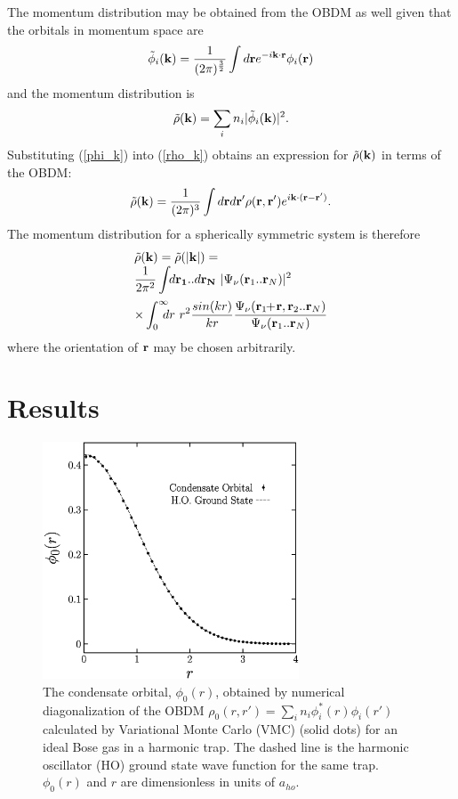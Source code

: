 \documentclass[aps,pra,twocolumn,groupedaddress]{revtex4}
\def\strut{\rule[-0.5cm]{0cm}{1cm}}
\begin{document}
The momentum distribution may be obtained from the OBDM as well given that
the orbitals in momentum space are 
\begin{equation}
\tilde{\phi}_i({\bf k}) = \frac{1}{ (2\pi)^{\frac{3}{2}} }
			\int d{\bf r} e^{ -i{\bf k}\cdot{\bf r} } 
			{\phi}_i({\bf r})
\label{phi_k}
\end{equation}
and the momentum distribution is
\begin{equation}
\tilde{\rho}({\bf k}) = \sum_i n_i|\tilde{\phi}_i({\bf k})|^2.
\label{rho_k}
\end{equation}
Substituting (\ref{phi_k}) into (\ref{rho_k}) obtains an expression for
$\tilde{\rho}({\bf k})$ in terms of the OBDM:
\begin{equation}
\tilde{\rho}({\bf k}) = \frac{1}{(2\pi)^3}\int d{\bf r}d{\bf r}'
		\rho({\bf r},{\bf r}')e^{i{\bf k}\cdot 
		({\bf r}-{\bf r'})}.
\end{equation}
The momentum distribution for a spherically symmetric system is therefore 
\begin{equation}
\begin{array}{l}
{\displaystyle
\tilde{\rho}({\bf k}) = \tilde{\rho}(|{\bf k}|) = 
}\\ 
\strut
\strut
{\displaystyle
\frac{1}{2\pi^2}\int \!\!d{\bf r_1}..d{\bf r_N}\  
	|\Psi_{\nu}({\bf r}_1..{\bf r}_N)|^2
}\\
{\displaystyle
\times	\int_0^{\infty}\!\!\!\!dr \  r^2 \frac{sin(kr)}{kr}
	\frac{\Psi_{\nu}({\bf r}_1\!\!+\!{\bf r},{\bf r}_2..{\bf r}_N)}
	{\Psi_{\nu}({\bf r}_1..{\bf r}_N)}
}
\end{array}
\end{equation}
where the orientation of ${\bf r}$ may be chosen arbitrarily.
\section{Results}

    \begin{figure}
\begin{center}
\includegraphics[width=3in]{fig1.ps}
\caption{ \footnotesize
    The condensate orbital, $\phi_0(r)$, obtained by numerical
    diagonalization of the OBDM $\rho_0(r,r') = \sum_i n_i \phi_i^*(r)\phi_i(r')$
    calculated by Variational Monte Carlo (VMC) (solid dots) for an ideal
    Bose gas in a harmonic trap.  The dashed line is the harmonic oscillator (HO)
    ground state wave function for the same trap.  $\phi_0(r)$ and $r$ are 
    dimensionless in units of $a_{ho}$.}
\end{center}
    \end{figure}
\end{document}
